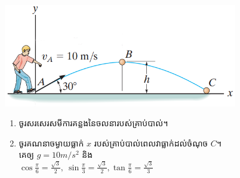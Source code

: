 \documentclass{officialexam}
\begin{document}
\begin{enumerate}[I]
		\begin{multicols}{2}
			\includegraphics[scale=1.8, height=128pt]{pic2}
			\begin{enumerate}[k]
				\item ចូរសរសេរសមីការគន្លងនៃចលនារបស់គ្រាប់បាល់។
				\item ចូរគណនាចម្ងាយធ្លាក់ $x$ របស់គ្រាប់បាល់ពេលវាធ្លាក់ដល់ចំណុច $C$។\\
				គេឲ្យ $g=10m/s^2$ និង\\ $\cos\frac{\pi}{6}=\frac{\sqrt{3}}{2},~\sin\frac{\pi}{3}=\frac{\sqrt{3}}{2}, \tan\frac{\pi}{6}=\frac{\sqrt{3}}{3}$
			\end{enumerate}
		\end{multicols}
	\end{enumerate}
\newpage
\borderline{\bigg[អត្រាកំណែវិញ្ញាសា រូបវិទ្យា\bigg]}\\
\end{document}
